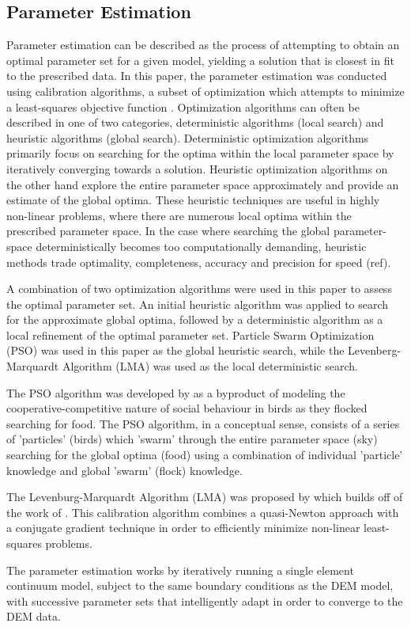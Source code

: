\subsection{Parameter Estimation}
Parameter estimation can be described as the process of attempting to obtain an optimal parameter set for a given model, yielding a solution that is closest in fit to the prescribed data. In this paper, the parameter estimation was conducted using calibration algorithms, a subset of optimization which attempts to minimize a least-squares objective function \cite{matott_ostrich:_2008}. Optimization algorithms can often be described in one of two categories, deterministic algorithms (local search) and heuristic algorithms (global search). Deterministic optimization algorithms primarily focus on searching for the optima within the local parameter space by iteratively converging towards a solution. Heuristic optimization algorithms on the other hand explore the entire parameter space approximately and provide an estimate of the global optima. These heuristic techniques are useful in highly non-linear problems, where there are numerous local optima within the prescribed parameter space. In the case where searching the global parameter-space deterministically becomes too computationally demanding, heuristic methods trade optimality, completeness, accuracy and precision for speed (ref). 

A combination of two optimization algorithms were used in this paper to assess the optimal parameter set. An initial heuristic algorithm was applied to search for the approximate global optima, followed by a deterministic algorithm as a local refinement of the optimal parameter set. Particle Swarm Optimization (PSO) was used in this paper as the global heuristic search, while the Levenberg-Marquardt Algorithm (LMA) was used as the local deterministic search. 

The PSO algorithm was developed by \citet{Kennedy} as a byproduct of modeling the cooperative-competitive nature of social behaviour in birds as they flocked searching for food. The PSO algorithm, in a conceptual sense, consists of a series of 'particles' (birds) which 'swarm' through the entire parameter space (sky) searching for the global optima (food) using a combination of individual 'particle' knowledge and global 'swarm' (flock) knowledge.

The Levenburg-Marquardt Algorithm (LMA) was proposed by \citet{marquardt_algorithm_1963} which builds off of the work of \citet{levenberg_method_1944}. This calibration algorithm combines a quasi-Newton approach with a conjugate gradient technique in order to efficiently minimize non-linear least-squares problems. 

The parameter estimation works by iteratively running a single element continuum model, subject to the same boundary conditions as the DEM model, with successive parameter sets that intelligently adapt in order to converge to the DEM data. 
